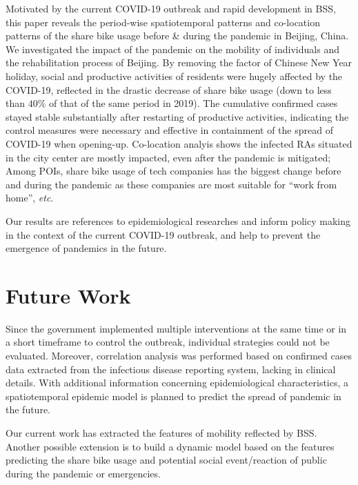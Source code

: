 \documentclass[preprints,ijgi,submit,moreauthors]{Definitions/mdpi}
\begin{document}
Motivated by the current COVID-19 outbreak and rapid development in BSS, this paper reveals the period-wise spatiotemporal patterns and co-location patterns of the share bike usage before \& during the pandemic in Beijing, China.
We investigated the impact of the pandemic on the mobility of individuals and the rehabilitation process of Beijing.
By removing the factor of Chinese New Year holiday, social and productive activities of residents were hugely affected by the COVID-19, reflected in the drastic decrease of share bike usage (down to less than $40\%$ of that of the same period in 2019). 
The cumulative confirmed cases stayed stable substantially after restarting of productive activities, indicating the control measures were necessary and effective in containment of the spread of COVID-19 when opening-up.
Co-location analyis shows the infected RAs situated in the city center are mostly impacted, even after the pandemic is mitigated;
Among POIs, share bike usage of tech companies has the biggest change before and during the pandemic as these companies are most suitable for ``work from home'', \textit{etc}.

Our results are references to epidemiological researches and inform policy making in the context of the current COVID-19 outbreak, and help to prevent the emergence of pandemics in the future.

\section{Future Work}

Since the government implemented multiple interventions at the same time or in a short timeframe to control the outbreak, individual strategies could not be evaluated.
Moreover, correlation analysis was performed based on confirmed cases data extracted from the infectious disease reporting system, lacking in clinical details. 
With additional information concerning epidemiological characteristics, a spatiotemporal epidemic model is planned to predict the spread of pandemic in the future.

Our current work has extracted the features of mobility reflected by BSS.
Another possible extension is to build a dynamic model based on the features predicting the share bike usage and potential social event/reaction of public during the pandemic or emergencies.

\vspace{6pt} 
\end{document}
